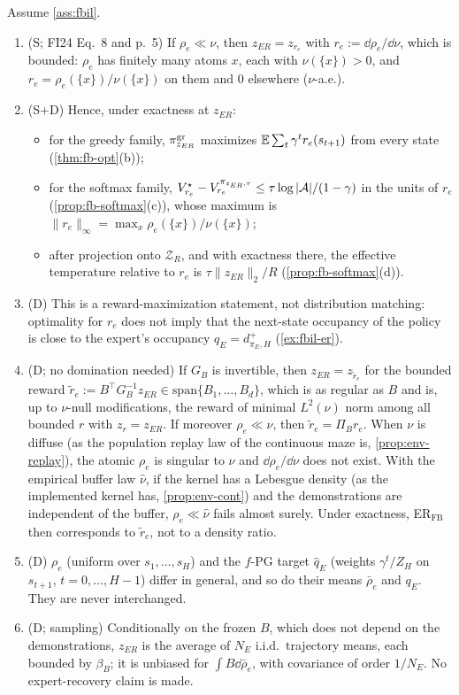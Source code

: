 \begin{proposition}\label{prop:fbil-er}
Assume \cref{ass:fbil}.
\begin{enumerate}[nosep,label=(\alph*)]
\item (\textsf{S}; FI24 Eq.~8 and p.~5) If $\rho_e\ll\nu$, then $z_{ER}=z_{r_e}$ with $r_e:=\dd\rho_e/\dd\nu$, which is bounded: $\rho_e$ has finitely many atoms $x$, each with $\nu(\{x\})>0$, and $r_e=\rho_e(\{x\})/\nu(\{x\})$ on them and $0$ elsewhere ($\nu$-a.e.).
\item (\textsf{S+D}) Hence, under exactness at $z_{ER}$:
  \begin{itemize}[nosep]
  \item for the greedy family, $\pi^{\mathrm{gr}}_{z_{ER}}$ maximizes $\mathbb{E}\sum_t\gamma^tr_e(s_{t+1})$ from every state (\cref{thm:fb-opt}(b));
  \item for the softmax family, $V^\star_{r_e}-V^{\pi_{z_{ER},\tau}}_{r_e}\le\tau\log|\mathcal{A}|/(1-\gamma)$ in the units of $r_e$ (\cref{prop:fb-softmax}(c)), whose maximum is $\|r_e\|_\infty=\max_x\rho_e(\{x\})/\nu(\{x\})$;
  \item after projection onto $\mathcal Z_R$, and with exactness there, the effective temperature relative to $r_e$ is $\tau\|z_{ER}\|_2/R$ (\cref{prop:fb-softmax}(d)).
  \end{itemize}
\item (\textsf{D}) This is a reward-maximization statement, not distribution matching: optimality for $r_e$ does not imply that the next-state occupancy of the policy is close to the expert's occupancy $q_E=d^+_{\pi_E,H}$ (\cref{ex:fbil-er}).
\item (\textsf{D}; no domination needed) If $G_B$ is invertible, then $z_{ER}=z_{\tilde r_e}$ for the bounded reward $\tilde r_e:=B^\top G_B^{-1}z_{ER}\in\mathrm{span}\{B_1,\dots,B_d\}$, which is as regular as $B$ and is, up to $\nu$-null modifications, the reward of minimal $L^2(\nu)$ norm among all bounded $r$ with $z_r=z_{ER}$.
  If moreover $\rho_e\ll\nu$, then $\tilde r_e=\Pi_Br_e$.
  When $\nu$ is diffuse (as the population replay law of the continuous maze is, \cref{prop:env-replay}), the atomic $\rho_e$ is singular to $\nu$ and $\dd\rho_e/\dd\nu$ does not exist. With the empirical buffer law $\hat\nu$, if the kernel has a Lebesgue density (as the implemented kernel has, \cref{prop:env-cont}) and the demonstrations are independent of the buffer, $\rho_e\ll\hat\nu$ fails almost surely. Under exactness, ER$_{\mathrm{FB}}$ then corresponds to $\tilde r_e$, not to a density ratio.
\item (\textsf{D}) $\rho_e$ (uniform over $s_1,\dots,s_H$) and the $f$-PG target $\hat q_E$ (weights $\gamma^t/Z_H$ on $s_{t+1}$, $t=0,\dots,H-1$) differ in general, and so do their means $\bar\rho_e$ and $q_E$. They are never interchanged.
\item (\textsf{D}; sampling) Conditionally on the frozen $B$, which does not depend on the demonstrations, $z_{ER}$ is the average of $N_E$ i.i.d.\ trajectory means, each bounded by $\beta_B$; it is unbiased for $\int B\dd\bar\rho_e$, with covariance of order $1/N_E$. No expert-recovery claim is made.
\end{enumerate}
\end{proposition}
